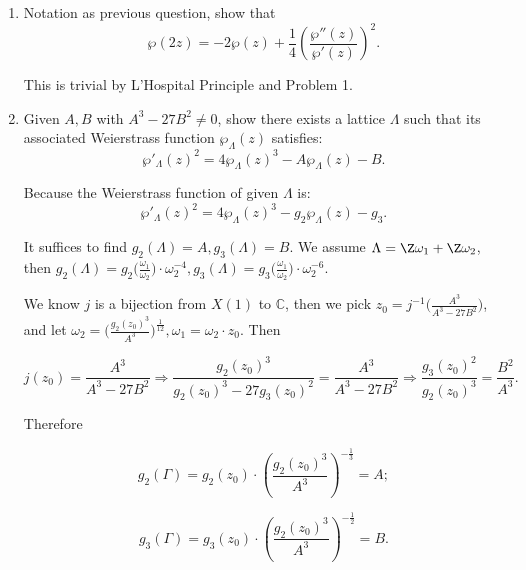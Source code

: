 \begin{enumerate}
\begin{proofc}[解答]
    Therefore: $$\wp(z+w) = \frac{1}{4}(A^2) - \wp(z) - \wp(w) = \frac14\left(\frac{\wp'(z) - \wp'(w)}{\wp(z) - \wp(w)}\right)^2 - \wp(z) - \wp(w).$$
    \end{proofc}


    \item Notation as previous question, show that 
    $$\wp(2z) = -2\wp(z) + \frac14(\frac{\wp''(z) }{\wp'(z)})^2.$$
    \begin{proofc}[解答]
        This is trivial by L'Hospital Principle and Problem 1.
    \end{proofc}





    \item  Given $A, B$ with $A^3 - 27 B^2 \neq 0$, show there exists a lattice $\Lambda$ such that its associated Weierstrass function $\wp_{\Lambda}(z)$ satisfies:
    $$\wp'_{\Lambda}(z)^2 = 4\wp_{\Lambda}(z)^3 - A\wp_{\Lambda}(z) - B.$$


    \begin{proofc}[解答]
    Because the Weierstrass function of given $\Lambda$ is:
    $$\wp'_{\Lambda}(z)^2 = 4\wp_{\Lambda}(z)^3 - g_2\wp_{\Lambda}(z) - g_3.$$

    It suffices to find $g_2(\Lambda) = A, g_3(\Lambda) = B$.
    We assume $\Lambda = \Z\omega_1 + \Z\omega_2 $, then 
    $g_2(\Lambda) = g_2\big(\frac{\omega_1}{\omega_2}\big) \cdot \omega_2^{-4}, g_3(\Lambda) = g_3\big(\frac{\omega_1}{\omega_2}\big) \cdot \omega_2^{-6}$.

    We know $j$ is a bijection from $X(1)$ to $\mathbb{C}$, then we pick $z_0 = j^{-1}\big(\frac{A^3}{A^3-27B^2}\big)$, and let 
    $\omega_2 = \big(\frac{g_2(z_0)^3}{A^3}\big)^{\frac{1}{12}}, \omega_1 = \omega_2 \cdot z_0$.
    Then 

    $$ j(z_0) = \frac{A^3}{A^3-27B^2} \Longrightarrow \frac{g_2(z_0)^3}{g_2(z_0)^3 - 27g_3(z_0)^2} = \frac{A^3}{A^3-27B^2} \Longrightarrow \frac{g_3(z_0)^2}{g_2(z_0)^3} = \frac{B^2}{A^3}.$$

    Therefore

    $$g_2(\Gamma) = g_2(z_0) \cdot \left(\frac{g_2(z_0)^3}{A^3}\right)^{-\frac13} = A;$$

    $$g_3(\Gamma) = g_3(z_0) \cdot \left(\frac{g_2(z_0)^3}{A^3}\right)^{-\frac12} = B.$$

    \end{proofc}






\end{enumerate}
